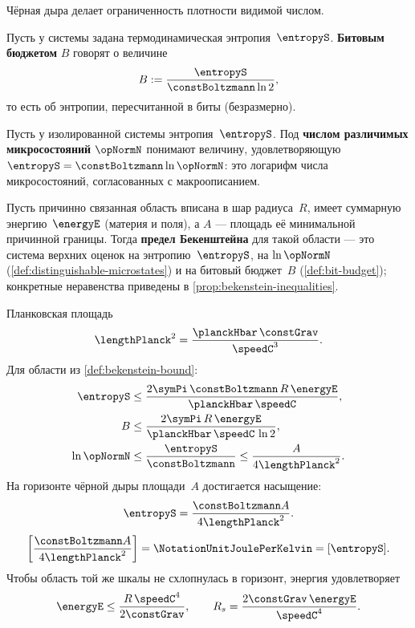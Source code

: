 Чёрная дыра делает ограниченность плотности видимой числом.

\begin{definition}
\label{def:bit-budget}
Пусть у системы задана термодинамическая энтропия~$\entropyS$.
\textbf{Битовым бюджетом} $B$ говорят о величине
\[
  B := \frac{\entropyS}{\constBoltzmann\ln 2},
\]
то есть об энтропии, пересчитанной в биты (безразмерно).
\end{definition}

\begin{definition}
\label{def:distinguishable-microstates}
Пусть у изолированной системы энтропия~$\entropyS$.
Под \textbf{числом различимых микросостояний} $\opNormN$ понимают величину,
удовлетворяющую $\entropyS=\constBoltzmann\ln\opNormN$:
это логарифм числа микросостояний, согласованных с макроописанием.
\end{definition}

\begin{definition}
\label{def:bekenstein-bound}
Пусть причинно связанная область вписана в шар радиуса~$R$,
имеет суммарную энергию~$\energyE$ (материя и поля),
а $A$ --- площадь её минимальной причинной границы.
Тогда \textbf{предел Бекенштейна} для такой области --- это система верхних оценок
на энтропию~$\entropyS$, на $\ln\opNormN$ (\cref{def:distinguishable-microstates})
и на битовый бюджет~$B$ (\cref{def:bit-budget});
конкретные неравенства приведены в \cref{prop:bekenstein-inequalities}.
\end{definition}

\begin{proposition}
\label{prop:bekenstein-inequalities}
Планковская площадь
\[
  \lengthPlanck^2=\frac{\planckHbar\,\constGrav}{\speedC^3}.
\]
Для области из \cref{def:bekenstein-bound}:
\begin{align}
  \entropyS &\le \frac{2\symPi\,\constBoltzmann\, R\,\energyE}{\planckHbar\,\speedC},
  \label{eq:bekenstein-S}\\
  B &\le \frac{2\symPi\, R\,\energyE}{\planckHbar\,\speedC\,\ln 2},
  \label{eq:bekenstein-bits}\\
  \ln\opNormN &\le \frac{\entropyS}{\constBoltzmann}
  \le \frac{A}{4\lengthPlanck^2}.
  \label{eq:state-count}
\end{align}
На горизонте чёрной дыры площади~$A$ достигается насыщение:
\begin{equation}
  \entropyS = \frac{\constBoltzmann A}{4\lengthPlanck^2}.
  \label{eq:bh-entropy}
\end{equation}
\begin{equation}
  \left[\frac{\constBoltzmann A}{4\lengthPlanck^2}\right]
  = \NotationUnitJoulePerKelvin
  = [\entropyS].
  \label{eq:bh-entropy-dim}
\end{equation}
Чтобы область той же шкалы не схлопнулась в горизонт, энергия удовлетворяет
\begin{equation}
  \energyE \le \frac{R\,\speedC^4}{2\constGrav},
  \qquad
  R_s=\frac{2\constGrav\,\energyE}{\speedC^4}.
  \label{eq:energy-bound}
\end{equation}
\end{proposition}

